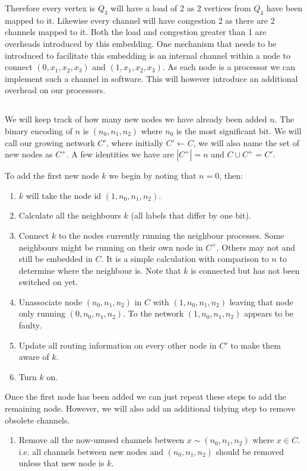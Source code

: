 Therefore every vertex is $Q_3$ will have a load of 2 as 2 vertices from $Q_4$ have been mapped to it.
Likewise every channel will have congestion 2 as there are 2 channels mapped to it.
Both the load and congestion greater than 1 are overheads introduced by this embedding.
One mechanism that needs to be introduced to facilitate this embedding is an internal channel within a node to connect $(0, x_1, x_2, x_3)$ and $(1, x_1, x_2, x_3)$.
As each node is a processor we can implement such a channel in software.
This will however introduce an additional overhead on our processors.

\subsection{}
We will keep track of how many new nodes we have already been added $n$.
The binary encoding of $n$ is $(n_0, n_1, n_2)$ where $n_0$ is the most significant bit.
We will call our growing network $C'$, where initially $C'\leftarrow C$, we will also name the set of new nodes as $C^+$.
A few identities we have are $|C^+|=n$ and $C \cup C^+ = C'$.

To add the first new node $k$ we begin by noting that $n=0$, then:
\begin{enumerate}
\item $k$ will take the node id $(1, n_0, n_1, n_2)$.
\item Calculate all the neighbours $k$ (all labels that differ by one bit).
\item Connect $k$ to the nodes currently running the neighbour processes. 
Some neighbours might be running on their own node in $C^+$.
Others may not and still be embedded in $C$.
It is a simple calculation with comparison to $n$ to determine where the neighbour is.
Note that $k$ is connected but has not been switched on yet.
\item Unassociate node $(n_0, n_1, n_2)$ in $C$ with $(1, n_0, n_1, n_2)$ leaving that node only running $(0, n_0, n_1, n_2)$.
To the network  $(1, n_0, n_1, n_2)$ appears to be faulty.
\item Update all routing information on every other node in $C'$ to make them aware of $k$.
\item Turn $k$ on.
\end{enumerate}
Once the first node has been added we can just repeat these steps to add the remaining node.
However, we will also add an additional tidying step to remove obsolete channels.
\begin{enumerate}[resume]
  \item Remove all the now-unused channels between $x\sim(n_0, n_1, n_2)$ where $x\in C$. i.e. all channels between new nodes and $(n_0, n_1, n_2)$ should be removed unless that new node is $k$.
\end{enumerate}


